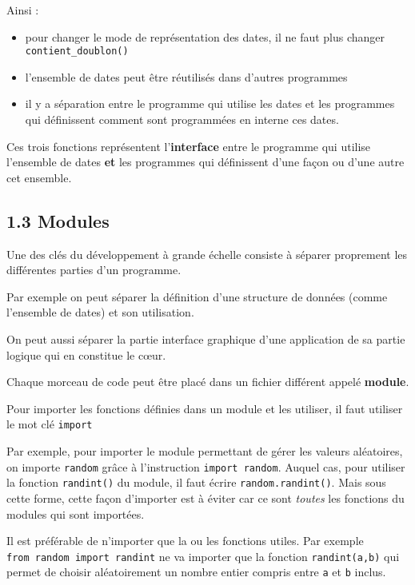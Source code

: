 \documentclass[a4paper,17pt]{extarticle}
\providecommand{\tightlist}{%
      \setlength{\itemsep}{0pt}\setlength{\parskip}{0pt}}
\begin{document}
    Ainsi :

\begin{itemize}
\tightlist
\item
  pour changer le mode de représentation des dates, il ne faut plus
  changer \texttt{contient\_doublon()}
\item
  l'ensemble de dates peut être réutilisés dans d'autres programmes
\item
  il y a séparation entre le programme qui utilise les dates et les
  programmes qui définissent comment sont programmées en interne ces
  dates.
\end{itemize}

Ces trois fonctions représentent l'\textbf{interface} entre le programme
qui utilise l'ensemble de dates \textbf{et} les programmes qui
définissent d'une façon ou d'une autre cet ensemble.

    \hypertarget{modules}{%
\subsection{1.3 Modules}\label{modules}}

    Une des clés du développement à grande échelle consiste à séparer
proprement les différentes parties d'un programme.

    Par exemple on peut séparer la définition d'une structure de données
(comme l'ensemble de dates) et son utilisation.

On peut aussi séparer la partie interface graphique d'une application de
sa partie logique qui en constitue le cœur.

    Chaque morceau de code peut être placé dans un fichier différent appelé
\textbf{module}.

Pour importer les fonctions définies dans un module et les utiliser, il
faut utiliser le mot clé \texttt{import}

    Par exemple, pour importer le module permettant de gérer les valeurs
aléatoires, on importe \texttt{random} grâce à l'instruction
\texttt{import\ random}. Auquel cas, pour utiliser la fonction
\texttt{randint()} du module, il faut écrire \texttt{random.randint()}.
Mais sous cette forme, cette façon d'importer est à éviter car ce sont
\emph{toutes} les fonctions du modules qui sont importées.

Il est préférable de n'importer que la ou les fonctions utiles. Par
exemple \texttt{from\ random\ import\ randint} ne va importer que la
fonction \texttt{randint(a,b)} qui permet de choisir aléatoirement un
nombre entier compris entre \texttt{a} et \texttt{b} inclus.
\end{document}
